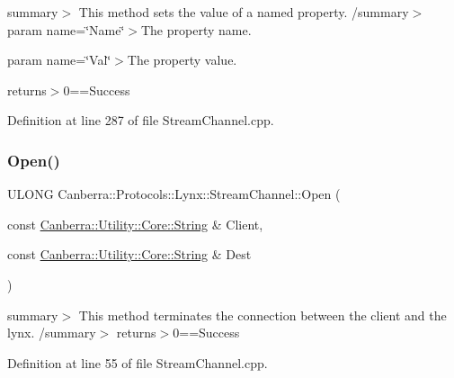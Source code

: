 summary$>$ This method sets the value of a named property. /summary$>$ param name=\char`\"{}\+Name\char`\"{}$>$The property name.

param name=\char`\"{}\+Val\char`\"{}$>$The property value.

returns$>$0==Success

Definition at line 287 of file Stream\+Channel.\+cpp.

\mbox{\label{class_canberra_1_1_protocols_1_1_lynx_1_1_stream_channel_a7b4e6b0164c4a5f1a480b02d1464fa3d_a7b4e6b0164c4a5f1a480b02d1464fa3d}} 
\subsubsection{\texorpdfstring{Open()}{Open()}}
{\footnotesize\ttfamily U\+L\+O\+NG Canberra\+::\+Protocols\+::\+Lynx\+::\+Stream\+Channel\+::\+Open (\begin{DoxyParamCaption}\item[{const \hyperlink{class_canberra_1_1_utility_1_1_core_1_1_string}{Canberra\+::\+Utility\+::\+Core\+::\+String} \&}]{Client,  }\item[{const \hyperlink{class_canberra_1_1_utility_1_1_core_1_1_string}{Canberra\+::\+Utility\+::\+Core\+::\+String} \&}]{Dest }\end{DoxyParamCaption})}

summary$>$ This method terminates the connection between the client and the lynx. /summary$>$ returns$>$0==Success

Definition at line 55 of file Stream\+Channel.\+cpp.

\mbox{\label{class_canberra_1_1_protocols_1_1_lynx_1_1_stream_channel_a25463e9739805a93b457c17874743de8_a25463e9739805a93b457c17874743de8}} 
